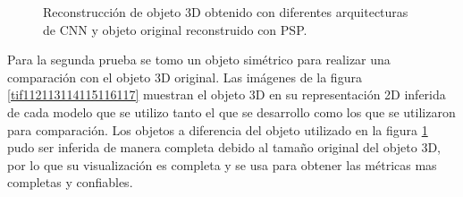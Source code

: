 \documentclass[10pt,letterpaper]{article}
\begin{document}
\begin{figure}[H]
\begin{center}
{            \label{tif91}}
        \caption{Reconstrucción de objeto 3D obtenido con diferentes arquitecturas de CNN y objeto original reconstruido con PSP.}
        \label{tif9091929394}
      \end{center}
\end{figure}


Para la segunda prueba se tomo un objeto simétrico para realizar una comparación con el objeto 3D original. Las imágenes de la figura \ref{tif112113114115116117} muestran el objeto 3D en su representación 2D inferida de cada modelo que se utilizo tanto el que se desarrollo como los que se utilizaron para comparación. Los objetos a diferencia del objeto utilizado en la figura \ref{tif9091929394} pudo ser inferida de manera completa debido al tamaño original del objeto 3D, por lo que su visualización es completa y se usa para obtener las métricas mas completas y confiables.
\end{document}
